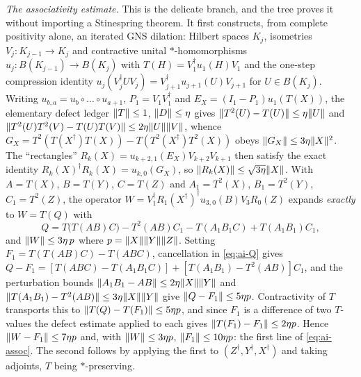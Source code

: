 \emph{The associativity estimate.} This is the delicate branch, and the tree proves it
without importing a Stinespring theorem. It first constructs, from complete positivity
alone, an iterated GNS dilation: Hilbert spaces $K_{j}$, isometries $V_{j}:K_{j-1}\to K_{j}$
and contractive unital $*$-homomorphisms $u_{j}:B(K_{j-1})\to B(K_{j})$ with
$T(H)=V_{1}^{\dagger}u_{1}(H)V_{1}$ and the one-step compression identity
$u_{j}(V_{j}^{\dagger}UV_{j})=V_{j+1}^{\dagger}u_{j+1}(U)V_{j+1}$ for $U\in B(K_{j})$.
Writing $u_{b,a}=u_{b}\circ\dots\circ u_{a+1}$, $P_{1}=V_{1}V_{1}^{\dagger}$ and
$E_{X}=(I_{1}-P_{1})u_{1}(T(X))$, the elementary defect ledger $\lVert T\rVert\le1$,
$\lVert D\rVert\le\eta$ gives
$\lVert T^{2}(U)-T(U)\rVert\le\eta\lVert U\rVert$ and
$\lVert T^{2}(U)T^{2}(V)-T(U)T(V)\rVert\le2\eta\lVert U\rVert\lVert V\rVert$, whence
$G_{X}=T^{2}(T(X^{\dagger})T(X))-T(T^{2}(X^{\dagger})T^{2}(X))$ obeys
$\lVert G_{X}\rVert\le3\eta\lVert X\rVert^{2}$. The ``rectangles''
$R_{k}(X)=u_{k+2,1}(E_{X})V_{k+2}V_{k+1}$ then satisfy the exact identity
$R_{k}(X)^{\dagger}R_{k}(X)=u_{k,0}(G_{X})$, so $\lVert R_{k}(X)\rVert\le\sqrt{3\eta}\lVert X\rVert$.
With $A=T(X)$, $B=T(Y)$, $C=T(Z)$ and $A_{1}=T^{2}(X)$, $B_{1}=T^{2}(Y)$, $C_{1}=T^{2}(Z)$,
the operator $W=V_{1}^{\dagger}R_{1}(X^{\dagger})^{\dagger}u_{3,0}(B)V_{3}R_{0}(Z)$
expands \emph{exactly} to $W=T(Q)$ with
\begin{equation}\label{eq:ai-Q}
  Q=T\bigl(T(AB)C\bigr)-T^{2}(AB)C_{1}-T(A_{1}B_{1}C)+T(A_{1}B_{1})C_{1},
\end{equation}
and $\lVert W\rVert\le3\eta\,p$ where $p=\lVert X\rVert\lVert Y\rVert\lVert Z\rVert$. Setting
$F_{1}=T(T(AB)C)-T(ABC)$, cancellation in \eqref{eq:ai-Q} gives
$Q-F_{1}=[T(ABC)-T(A_{1}B_{1}C)]+[T(A_{1}B_{1})-T^{2}(AB)]C_{1}$, and the perturbation
bounds $\lVert A_{1}B_{1}-AB\rVert\le2\eta\lVert X\rVert\lVert Y\rVert$ and
$\lVert T(A_{1}B_{1})-T^{2}(AB)\rVert\le3\eta\lVert X\rVert\lVert Y\rVert$ give $\lVert Q-F_{1}\rVert\le5\eta p$.
Contractivity of $T$ transports this to $\lVert T(Q)-T(F_{1})\rVert\le5\eta p$, and since
$F_{1}$ is a difference of two $T$-values the defect estimate applied to each gives
$\lVert T(F_{1})-F_{1}\rVert\le2\eta p$. Hence $\lVert W-F_{1}\rVert\le7\eta p$ and, with
$\lVert W\rVert\le3\eta p$, $\lVert F_{1}\rVert\le10\eta p$: the first line of \eqref{eq:ai-assoc}.
The second follows by applying the first to $(Z^{\dagger},Y^{\dagger},X^{\dagger})$ and
taking adjoints, $T$ being $*$-preserving.

